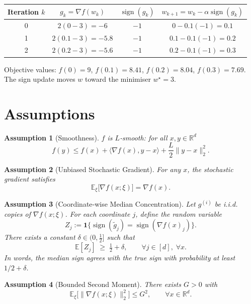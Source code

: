 \documentclass{article}
\newtheorem{assumption}{Assumption}
\newcommand{\sign}{\operatorname{sign}}
\newcommand{\E}{\mathbb{E}}
\newcommand{\R}{\mathbb{R}}
\begin{document}
\begin{center}
\begin{tabular}{c|c|c|c}
Iteration $k$ & $g_{k}= \nabla f(w_{k})$ & $\sign(g_{k})$ & $w_{k+1}=w_{k}-\alpha\sign(g_{k})$ \\ \hline
0 & $2(0-3)=-6$ & $-1$ & $0-0.1(-1)=0.1$ \\
1 & $2(0.1-3)=-5.8$ & $-1$ & $0.1-0.1(-1)=0.2$ \\
2 & $2(0.2-3)=-5.6$ & $-1$ & $0.2-0.1(-1)=0.3$
\end{tabular}
\end{center}
Objective values: $f(0)=9$, $f(0.1)=8.41$, $f(0.2)=8.04$, $f(0.3)=7.69$.  
The sign update moves $w$ toward the minimiser $w^{\star}=3$.

\newpage
\section*{Assumptions}
\begin{assumption}[Smoothness]\label{ass:smooth}
$f$ is $L$‑smooth: for all $x,y\in\R^{d}$
\[
f(y)\le f(x)+\langle\nabla f(x),y-x\rangle+\frac{L}{2}\|y-x\|_{2}^{2}.
\]
\end{assumption}

\begin{assumption}[Unbiased Stochastic Gradient]\label{ass:unbiased}
For any $x$, the stochastic gradient satisfies
\[
\E_{\xi}\bigl[\nabla f(x;\xi)\bigr]=\nabla f(x).
\]
\end{assumption}

\begin{assumption}[Coordinate‑wise Median Concentration]\label{ass:median}
Let $g^{(i)}$ be i.i.d. copies of $\nabla f(x;\xi)$.  
For each coordinate $j$, define the random variable
\[
Z_{j}:=\mathbf{1}\{\sign(\tilde g_{j})=\sign(\nabla f(x)_{j})\}.
\]
There exists a constant $\delta\in(0,\tfrac12]$ such that
\[
\E[Z_{j}]\;\ge\;\tfrac12+\delta,\qquad\forall j\in[d],\;\forall x.
\tag{2}
\]
In words, the median sign agrees with the true sign with probability at least $1/2+\delta$.
\end{assumption}

\begin{assumption}[Bounded Second Moment]\label{ass:bounded}
There exists $G>0$ with
\[
\E_{\xi}\bigl[\|\nabla f(x;\xi)\|_{2}^{2}\bigr]\le G^{2},
\qquad\forall x\in\R^{d}.
\tag{3}
\]
\end{assumption}
\end{document}
